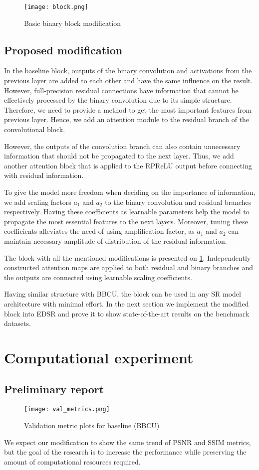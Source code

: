 \documentclass{article}
\begin{document}
\begin{figure}[h]
\label{block}
\centering
\texttt{[image: block.png]}
\caption{Basic binary block modification} \label{block}
\end{figure}

\subsection{Proposed modification}
In the baseline block, outputs of the binary convolution and activations from the previous layer are added to each other and have the same influence on the result. However, full-precision residual connections have information that cannot be effectively processed by the binary convolution due to its simple structure. Therefore, we need to provide a method to get the most important features from previous layer. Hence, we add an attention module to the residual branch of the convolutional block. 

However, the outputs of the convolution branch can also contain unnecessary information that should not be propagated to the next layer. Thus, we add another attention block that is applied to the RPReLU output before connecting with residual information.

To give the model more freedom when deciding on the importance of information, we add scaling factors $a_1$ and $a_2$ to the binary convolution and residual branches respectively. Having these coefficients as learnable parameters help the model to propagate the most essential features to the next layers. Moreover, tuning these coefficients alleviates the need of using amplification factor, as $a_1$ and $a_2$ can maintain necessary amplitude of distribution of the residual information.

The block with all the mentioned modifications is presented on \ref{block}. Independently constructed attention maps are applied to both residual and binary branches and the outputs are connected using learnable scaling coefficients. 

Having similar structure with BBCU, the block can be used in any SR model architecture with minimal effort. In the next section we implement the modified block into EDSR and prove it to show state-of-the-art results on the benchmark datasets.

\section{Computational experiment}
\subsection{Preliminary report}
\begin{figure}[h]
\caption{Validation metric plots for baseline (BBCU)}
\centering
\texttt{[image: val\_metrics.png]}
\end{figure}
We expect our modification to show the same trend of PSNR and SSIM metrics, but the goal of the research is to increase the performance while preserving the amount of computational resources required.




\end{document}
